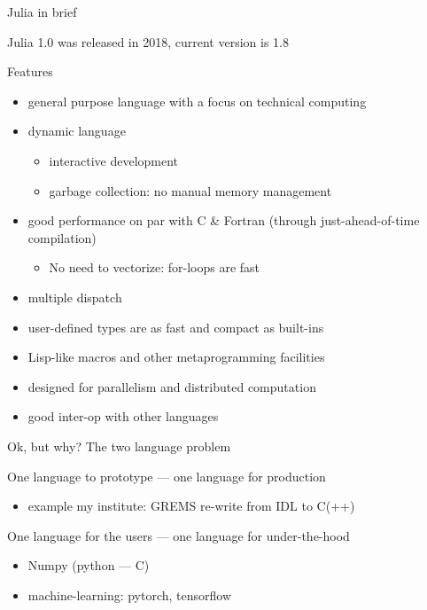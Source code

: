 \documentclass[compress,presentation,aspectratio=169]{beamer}
\begin{document}
\begin{frame}[label={sec:orgf4971a5}]{Julia in brief}
      \footnotesize
\begin{block}{Julia 1.0 was released in 2018, current version is 1.8}
\end{block}

\begin{block}{Features}
\begin{itemize}
\item general purpose language with a focus on technical computing
\item dynamic language
\begin{itemize}
\item interactive development
\item garbage collection: no manual memory management
\end{itemize}
\item good performance on par with C \& Fortran (through just-ahead-of-time compilation)
\begin{itemize}
\item No need to vectorize: for-loops are fast
\end{itemize}
\item multiple dispatch
\item user-defined types are as fast and compact as built-ins
\item Lisp-like macros and other metaprogramming facilities
\item designed for parallelism and distributed computation
\item good inter-op with other languages
\end{itemize}
\end{block}
\end{frame}

\begin{frame}[label={sec:org28a3717}]{Ok, but why?}
  \footnotesize
\alert{The two language problem}

\begin{block}{One language to prototype   ---  one language for production}
\begin{itemize}
\item example my institute: GREMS re-write from IDL to C(++)
\end{itemize}
\end{block}

\begin{block}{One language for the users  ---  one language for under-the-hood}
\begin{itemize}
\item Numpy (python --- C)
\item machine-learning: pytorch, tensorflow
\end{itemize}
\end{block}
\end{frame}
\end{document}
